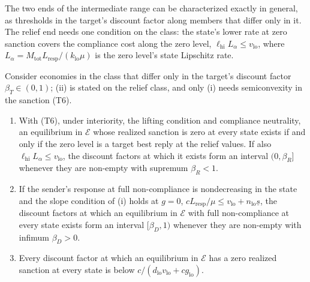 The two ends of the intermediate range can be characterized exactly in general, as thresholds in the
target's discount factor along members that differ only in it. The relief end needs one
condition on the class: the state's lower rate at zero sanction covers the compliance cost
along the zero level, $\ell_{\mathrm{hi}}L_\alpha\le v_{\mathrm{lo}}$, where
$L_\alpha=M_{\mathrm{tot}}L_{\mathrm{resp}}/(k_{\mathrm{lo}}\mu)$ is the zero level's state
Lipschitz rate.

\begin{proposition}
\label{prop:exact-thresholds}
Consider economies in the class that differ only in the target's discount factor
$\beta_T\in(0,1)$; (ii) is stated on the relief class, and only (i) needs
semiconvexity in the sanction \textup{(T6)}.
\begin{enumerate}[label=(\roman*)]
\item With \textup{(T6)}, under interiority, the lifting condition and compliance
neutrality, an equilibrium in $\mathcal E$ whose
realized sanction is zero at every state exists if and only if the zero level is a target
best reply at the relief values. If also $\ell_{\mathrm{hi}}L_\alpha\le v_{\mathrm{lo}}$, the
discount factors at which it exists form an interval $(0,\beta_R]$ whenever they are
non-empty with supremum $\beta_R<1$.
\item If the sender's response at full non-compliance is nondecreasing in the state and the
slope condition of (i) holds at $g=0$,
$cL_{\mathrm{resp}}/\mu\le v_{\mathrm{lo}}+n_{\mathrm{lo}}\underline s$, the discount factors at
which an equilibrium in $\mathcal E$ with full non-compliance at every state exists form an interval
$[\beta_D,1)$ whenever they are non-empty with infimum $\beta_D>0$.
\item Every discount factor at which an equilibrium in $\mathcal E$ has a zero realized sanction
at every state is below $c/(d_{\mathrm{lo}}v_{\mathrm{lo}}+cg_{\mathrm{lo}})$.
\end{enumerate}
\end{proposition}

